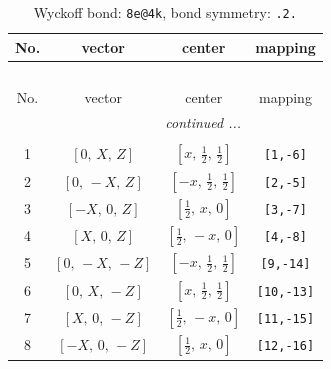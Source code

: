\documentclass[fleqn,8pt]{jsarticle}
\begin{document}
\begin{longtable}{cccc}
\caption{Wyckoff bond: {\tt 8e@4k}, bond symmetry: {\tt .2.}}
 \\
 \hline \hline
No. & vector & center & mapping \\ \hline \endfirsthead

\multicolumn{3}{l}{\tablename\ \thetable{}} \\
 \hline \hline
No. & vector & center & mapping \\ \hline \endhead

 \hline \hline
\multicolumn{3}{r}{\footnotesize\it continued ...} \\ \endfoot

 \hline \hline
\multicolumn{3}{r}{} \\ \endlastfoot

1 & $\left[ 0,\, X,\, Z \right]$ & $\left[ x,\, \frac{1}{2},\, \frac{1}{2} \right]$ & {\tt [1,-6]} \\ \hline
2 & $\left[ 0,\, - X,\, Z \right]$ & $\left[ - x,\, \frac{1}{2},\, \frac{1}{2} \right]$ & {\tt [2,-5]} \\ \hline
3 & $\left[ - X,\, 0,\, Z \right]$ & $\left[ \frac{1}{2},\, x,\, 0 \right]$ & {\tt [3,-7]} \\ \hline
4 & $\left[ X,\, 0,\, Z \right]$ & $\left[ \frac{1}{2},\, - x,\, 0 \right]$ & {\tt [4,-8]} \\ \hline
5 & $\left[ 0,\, - X,\, - Z \right]$ & $\left[ - x,\, \frac{1}{2},\, \frac{1}{2} \right]$ & {\tt [9,-14]} \\ \hline
6 & $\left[ 0,\, X,\, - Z \right]$ & $\left[ x,\, \frac{1}{2},\, \frac{1}{2} \right]$ & {\tt [10,-13]} \\ \hline
7 & $\left[ X,\, 0,\, - Z \right]$ & $\left[ \frac{1}{2},\, - x,\, 0 \right]$ & {\tt [11,-15]} \\ \hline
8 & $\left[ - X,\, 0,\, - Z \right]$ & $\left[ \frac{1}{2},\, x,\, 0 \right]$ & {\tt [12,-16]} \\
\end{longtable}
\renewcommand{\arraystretch}{1.2}
\end{document}

